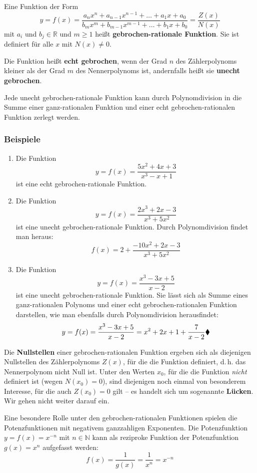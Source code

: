 Eine Funktion der Form
\[ y = f(x) = \frac{a_n x^n + a_{n-1} x^{n-1} + \ldots + a_1 x + a_0}{b_m x^m + b_{m-1} x^{m-1} + \ldots + b_1 x + b_0} = \frac{Z(x)}{N(x)} \]
mit $a_i$ und $b_j \in \mathbb{R}$ und $m \geq 1$ heißt \textbf{gebrochen-rationale Funktion}. Sie ist definiert für alle $x$ mit $N(x) \neq 0$.

Die Funktion heißt \textbf{echt gebrochen}, wenn der Grad $n$ des Zählerpolynoms kleiner als der Grad $m$ des Nennerpolynoms ist, andernfalls heißt sie \textbf{unecht gebrochen}.

Jede unecht gebrochen-rationale Funktion kann durch Polynomdivision in die Summe einer ganz-rationalen Funktion und einer echt gebrochen-rationalen Funktion zerlegt werden.

\subsubsection{Beispiele}

\begin{enumerate}[label=\alph*)]
  \item Die Funktion
    \[ y = f(x) = \frac{5x^2 + 4x + 3}{x^3 - x + 1} \]
    ist eine echt gebrochen-rationale Funktion.
  \item Die Funktion
    \[ y = f(x) = \frac{2x^3 + 2x - 3}{x^3 + 5x^2} \]
    ist eine unecht gebrochen-rationale Funktion. Durch Polynomdivision findet man heraus:
    \[ f(x) = 2 + \frac{-10x^2 + 2x - 3}{x^3 + 5x^2} \]
  \item Die Funktion
    \[ y = f(x) = \frac{x^3 - 3x + 5}{x - 2} \]
    ist eine unecht gebrochen-rationale Funktion. Sie lässt sich als Summe eines ganz-rationalen Polynoms und einer echt gebrochen-rationalen Funktion darstellen, wie man ebenfalls durch Polynomdivision herausfindet:
    \[ y = f(x) = \frac{x^3 - 3x + 5}{x - 2} = x^2 + 2x + 1 + \frac{7}{x - 2}\beispielende \]
\end{enumerate}

Die \textbf{Nullstellen} einer gebrochen-rationalen Funktion ergeben sich als diejenigen Nullstellen des Zählerpolynoms $Z(x)$, für die die Funktion definiert, d.\,h. das Nennerpolynom nicht Null ist. Unter den Werten $x_0$, für die die Funktion \emph{nicht} definiert ist (wegen $N(x_0) = 0$), sind diejenigen noch einmal von besonderem Interesse, für die auch $Z(x_0) = 0$ gilt -- es handelt sich um sogenannte \textbf{Lücken}. Wir gehen nicht weiter darauf ein.

Eine besondere Rolle unter den gebrochen-rationalen Funktionen spielen die Potenzfunktionen mit negativem ganzzahligen Exponenten. Die Potenzfunktion $y = f(x) = x^{-n}$ mit $n \in \mathbb{N}$ kann als reziproke Funktion der Potenzfunktion $g(x) = x^n$ aufgefasst werden:
\[ f(x) = \frac{1}{g(x)} = \frac{1}{x^n} = x^{-n} \]

